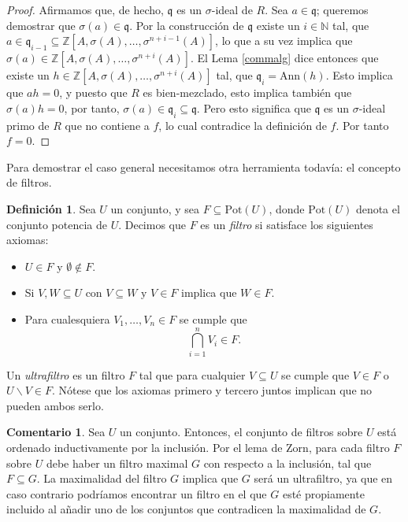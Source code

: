 \documentclass[letterpaper]{article}
\def\N{\mathbb{N}}
\def\Z{\mathbb{Z}}
\def\q{\mathfrak{q}}
\def\s{\sigma}
\theoremstyle{definition}
\newtheorem{rem}[Satz]{Comentario}
\newtheorem{defn}[Satz]{Definici\'on}
\begin{document}
\begin{proof}
Afirmamos que, de hecho, $\q$ es un $\sigma$-ideal de $R$. Sea $a \in \q$; queremos demostrar que  $\s(a) \in \q$.  
Por la construcci\'on de $\q$ existe un $i \in \N$ tal, que $a \in \q_{i-1} \subseteq \Z[A,\s(A),\ldots,\s^{n+i-1}(A)]$, lo que a su vez implica que $\s(a) \in \Z[A,\s(A),\ldots,\s^{n+i}(A)]$. 
El Lema \ref{commalg} dice entonces que existe un $h \in \Z[A,\s(A),\ldots,\s^{n+i}(A)]$ tal, que $ \q_i = \text{Ann}(h)$.
Esto implica que $ah = 0$, y puesto que $R$ es bien-mezclado, esto implica tambi\'en que $\s(a)h = 0$, por tanto, $\s(a) \in \q_i \subseteq \q$. 
Pero esto significa que  $\q$ es un $\sigma$-ideal primo de $R$ que no contiene a $f$, lo cual contradice la definici\'on de $f$. Por tanto $f = 0$.
\end{proof}


Para demostrar el caso general necesitamos otra herramienta todav\'ia: el concepto de filtros.

\begin{defn}
Sea $U$ un conjunto, y sea $F \subseteq \text{Pot}(U)$, donde $\text{Pot}(U)$ denota el conjunto potencia de $U$. Decimos que $F$ es un \emph{filtro} si satisface los siguientes axiomas:
\begin{itemize}
\item  $U \in F$ y $\emptyset \notin F$.
\item Si $V,W \subseteq U$ con $V \subseteq W \text{ y }V  \in F $ implica que $W \in F$.
\item Para cualesquiera $V_1, \ldots, V_n \in F$ se cumple que \[ \bigcap_{i = 1}^n V_i \in F. \]
\end{itemize}
Un \emph{ultrafiltro} es un filtro $F$ tal que para cualquier $V \subseteq U$ se cumple que $V \in F$ o $U \backslash V \in F$. N\'otese que los axiomas primero y tercero juntos implican que no pueden ambos serlo.
\end{defn}

\begin{rem}
Sea $U$ un conjunto. Entonces, el conjunto de filtros sobre $U$ est\'a ordenado inductivamente por la inclusi\'on. Por el lema de Zorn, para cada filtro $F$ sobre $U$ debe haber un filtro maximal $G$ con respecto a la inclusi\'on, tal que $F \subseteq G$.
La maximalidad del filtro $G$ implica que $G$ ser\'a un ultrafiltro, ya que en caso contrario podr\'iamos encontrar un filtro en el que $G$ est\'e propiamente incluido al a\~nadir uno de los conjuntos que contradicen la maximalidad de $G$.
\end{rem}
\end{document}
